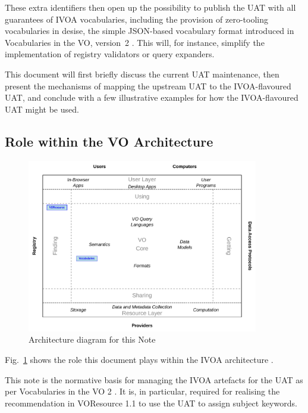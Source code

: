 \documentclass[11pt,a4paper]{ivoa}
\begin{document}
These extra identifiers then open up the possibility to publish the UAT
with all guarantees of IVOA vocabularies, including the provision of
zero-tooling vocabularies in desise, the simple JSON-based vocabulary
format introduced in Vocabularies in the VO, version~2
\citep{2021ivoa.spec.0525D}.  This will, for instance, simplify
the implementation of registry validators or query expanders.

This document will first briefly discuss the current UAT maintenance,
then present the mechanisms of mapping the upstream UAT to the
IVOA-flavoured UAT, and conclude with a few illustrative examples for
how the IVOA-flavoured UAT might be used.

\subsection{Role within the VO Architecture}

\begin{figure}
\centering

\includegraphics[width=0.9\textwidth]{role_diagram.pdf}
\caption{Architecture diagram for this Note}
\label{fig:archdiag}
\end{figure}

Fig.~\ref{fig:archdiag} shows the role this document plays within the
IVOA architecture \citep{2021ivoa.spec.1101D}.

This note is the normative basis for managing the IVOA artefacts for the
UAT as per Vocabularies in the VO 2 \citep{2021ivoa.spec.0525D}.  
It is, in particular,
required for realising the recommendation in VOResource 1.1
\citep{2018ivoa.spec.0625P} to use the UAT to assign subject keywords.
\end{document}
